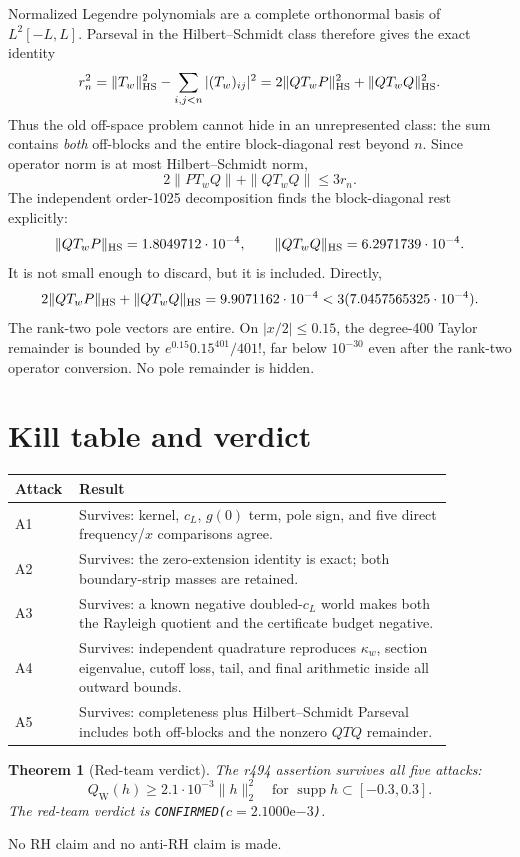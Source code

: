 \documentclass[11pt]{article}
\newtheorem{theorem}{Theorem}
\theoremstyle{remark}
\newcommand{\QW}{Q_{\mathrm W}}
\begin{document}
Normalized Legendre polynomials are a complete orthonormal basis of
$L^2[-L,L]$.  Parseval in the Hilbert--Schmidt class therefore gives
the exact identity
\[
 r_n^2=\|T_w\|_{\rm HS}^2-\sum_{i,j<n}|(T_w)_{ij}|^2
 =2\|Q T_wP\|_{\rm HS}^2+\|Q T_wQ\|_{\rm HS}^2.
\]
Thus the old off-space problem cannot hide in an unrepresented class:
the sum contains \emph{both} off-blocks and the entire block-diagonal
rest beyond $n$.  Since operator norm is at most Hilbert--Schmidt norm,
\[
 2\|PT_wQ\|+\|QT_wQ\|\le3r_n.
\]
The independent order-1025 decomposition finds the block-diagonal
rest explicitly:
\[
 \|QT_wP\|_{\rm HS}=1.8049712\cdot10^{-4},\qquad
 \|QT_wQ\|_{\rm HS}=6.2971739\cdot10^{-4}.
\]
It is not small enough to discard, but it is included.  Directly,
\[
 2\|QT_wP\|_{\rm HS}+\|QT_wQ\|_{\rm HS}
 =9.9071162\cdot10^{-4}
 <3(7.0457565325\cdot10^{-4}).
\]
The rank-two pole vectors are entire.  On $|x/2|\le0.15$, the
degree-400 Taylor remainder is bounded by
$e^{0.15}0.15^{401}/401!$, far below $10^{-30}$ even after the
rank-two operator conversion.  No pole remainder is hidden.

\section{Kill table and verdict}

\begin{center}
\small
\begin{tabular}{@{}p{0.08\linewidth}p{0.79\linewidth}@{}}
\toprule
Attack&Result\\
\midrule
A1&Survives: kernel, $c_L$, $g(0)$ term, pole sign, and five direct
frequency/$x$ comparisons agree.\\
A2&Survives: the zero-extension identity is exact; both boundary-strip
masses are retained.\\
A3&Survives: a known negative doubled-$c_L$ world makes both the
Rayleigh quotient and the certificate budget negative.\\
A4&Survives: independent quadrature reproduces $\kappa_w$, section
eigenvalue, cutoff loss, tail, and final arithmetic inside all outward
bounds.\\
A5&Survives: completeness plus Hilbert--Schmidt Parseval includes both
off-blocks and the nonzero $QTQ$ remainder.\\
\bottomrule
\end{tabular}
\end{center}

\begin{theorem}[Red-team verdict]
The r494 assertion survives all five attacks:
\[
 \boxed{\QW(h)\ge2.1\cdot10^{-3}\|h\|_2^2
 \quad\text{for }\operatorname{supp}h\subset[-0.3,0.3].}
\]
The red-team verdict is
\texttt{CONFIRMED($c=2.1000\mathrm e{-3}$)}.
\end{theorem}

No RH claim and no anti-RH claim is made.
\end{document}
